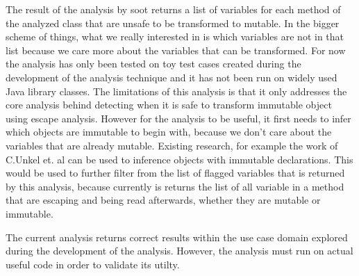 The result of the analysis by soot returns a list of variables for each method of the analyzed class that are unsafe to be transformed to mutable. In the bigger scheme of things, what we really interested in is which variables are not in that list because we care more about the variables that can be transformed. For now the analysis has only been tested on toy test cases created during the development of the analysis technique and it has not been run on widely used Java library classes. The limitations of this analysis is that it only addresses the core analysis behind detecting when it is safe to transform immutable object using escape analysis. However for the analysis to be useful, it first needs to infer which objects are immutable to begin with, because we don't care about the variables that are already mutable. Existing research, for example the work of C.Unkel et. al \cite{ref:finalinference} can be used to inference objects with immutable declarations. This would be used to further filter from the list of flagged variables that is returned by this analysis, because currently is returns the list of all variable in a method that are escaping and being read afterwards, whether they are mutable or immutable.

The current analysis returns correct results within the use case domain explored during the development of the analysis. However, the analysis must run on actual useful code in order to validate its utilty.